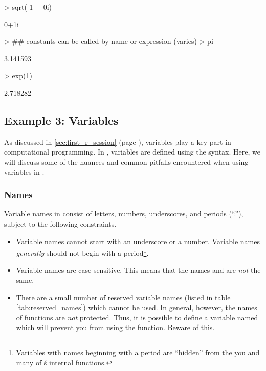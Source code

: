 \documentclass[10pt,letterpaper]{article}
\begin{document}
\begin{Schunk}
\begin{Sinput}
> sqrt(-1 + 0i)
\end{Sinput}
\begin{Soutput}
[1] 0+1i
\end{Soutput}
\begin{Sinput}
> ## constants can be called by name or expression (varies)
> pi
\end{Sinput}
\begin{Soutput}
[1] 3.141593
\end{Soutput}
\begin{Sinput}
> exp(1)
\end{Sinput}
\begin{Soutput}
[1] 2.718282
\end{Soutput}
\end{Schunk}



\subsection{Example 3: Variables} %
\label{sub:ex_variables_intro}

As discussed in \ref{sec:first_r_session} (page \pageref{sec:first_r_session}), variables play a key part in computational programming.  In \R, variables are defined using the  syntax.  Here, we will discuss some of the nuances and common pitfalls encountered when using variables in \R.

\subsubsection{Names} %
\label{ssub:vars_names}

Variable names in \R consist of letters, numbers, underscores, and periods (``.''), subject to the following constraints.
\begin{itemize}
  \item Variable names cannot start with an underscore or a number.  Variable names \emph{generally} should not begin with a period\footnote{Variables with names beginning with a period are ``hidden'' from the you and many of \R\'s internal functions. }.
  \item Variable names are case sensitive.  This means that the names  and  are \emph{not} the same.
  \item There are a small number of reserved variable names (listed in table \ref{tab:reserved_names}) which cannot be used.  In general, however, the names of \R functions are \emph{not} protected.  Thus, it is possible to define a variable named  which will prevent you from using the  function.  Beware of this.
\end{itemize}
\end{document}
